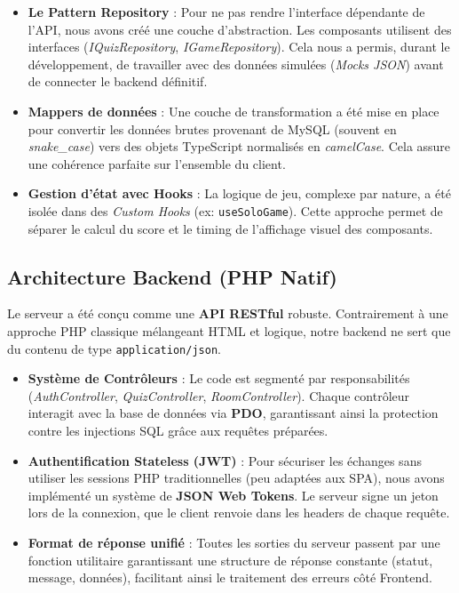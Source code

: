 \documentclass[12pt,a4paper]{article}
\begin{document}
\begin{itemize}
    \item \textbf{Le Pattern Repository} : Pour ne pas rendre l'interface dépendante de l'API, nous avons créé une couche d'abstraction. Les composants utilisent des interfaces (\textit{IQuizRepository}, \textit{IGameRepository}). Cela nous a permis, durant le développement, de travailler avec des données simulées (\textit{Mocks JSON}) avant de connecter le backend définitif.
    \item \textbf{Mappers de données} : Une couche de transformation a été mise en place pour convertir les données brutes provenant de MySQL (souvent en \textit{snake\_case}) vers des objets TypeScript normalisés en \textit{camelCase}. Cela assure une cohérence parfaite sur l'ensemble du client.
    \item \textbf{Gestion d'état avec Hooks} : La logique de jeu, complexe par nature, a été isolée dans des \textit{Custom Hooks} (ex: \texttt{useSoloGame}). Cette approche permet de séparer le calcul du score et le timing de l'affichage visuel des composants.
\end{itemize}

\subsection{Architecture Backend (PHP Natif)}
Le serveur a été conçu comme une \textbf{API RESTful} robuste. Contrairement à une approche PHP classique mélangeant HTML et logique, notre backend ne sert que du contenu de type \texttt{application/json}.

\begin{itemize}
    \item \textbf{Système de Contrôleurs} : Le code est segmenté par responsabilités (\textit{AuthController}, \textit{QuizController}, \textit{RoomController}). Chaque contrôleur interagit avec la base de données via \textbf{PDO}, garantissant ainsi la protection contre les injections SQL grâce aux requêtes préparées.
    \item \textbf{Authentification Stateless (JWT)} : Pour sécuriser les échanges sans utiliser les sessions PHP traditionnelles (peu adaptées aux SPA), nous avons implémenté un système de \textbf{JSON Web Tokens}. Le serveur signe un jeton lors de la connexion, que le client renvoie dans les headers de chaque requête.
    \item \textbf{Format de réponse unifié} : Toutes les sorties du serveur passent par une fonction utilitaire garantissant une structure de réponse constante (statut, message, données), facilitant ainsi le traitement des erreurs côté Frontend.
\end{itemize}
\end{document}
